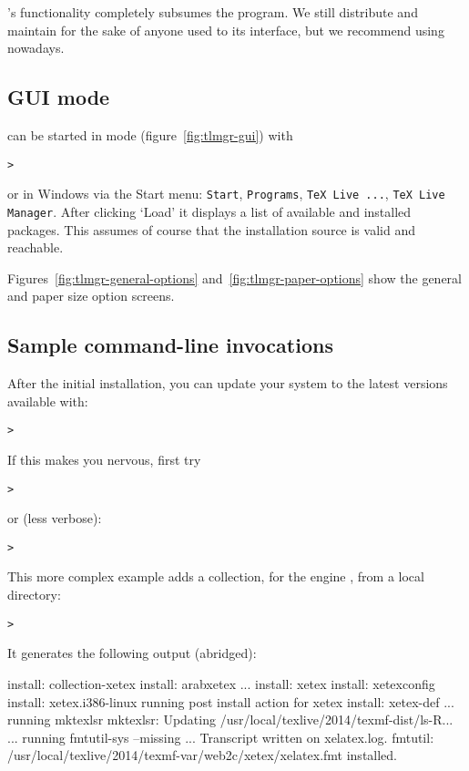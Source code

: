 \documentclass{article}
\begin{document}
's functionality completely subsumes the 
program.  We still distribute and maintain  for the sake
of anyone used to its interface, but we recommend using 
nowadays.

\subsection{ GUI mode}
 can be started in \GUI{} mode (figure~\ref{fig:tlmgr-gui}) with
\begin{alltt}
> 
\end{alltt}
or in Windows via the Start menu: \texttt{Start}, \texttt{Programs},
\texttt{TeX Live ...}, \texttt{TeX Live Manager}. After clicking `Load'
it displays a list of available and installed packages.  This assumes of
course that the installation source is valid and reachable.

Figures~\ref{fig:tlmgr-general-options} and~\ref{fig:tlmgr-paper-options}
show the general and paper size option screens.

\subsection{Sample  command-line invocations}

After the initial installation, you can update your system to the latest
versions available with:
\begin{alltt}
> 
\end{alltt}
If this makes you nervous, first try
\begin{alltt}
> 
\end{alltt}
or (less verbose):
\begin{alltt}
> 
\end{alltt}

This more complex example adds a collection, for the engine \XeTeX, from
a local directory:

\begin{alltt}
> 
\end{alltt}
It generates the following output (abridged):
\begin{fverbatim}
install: collection-xetex
install: arabxetex
...
install: xetex
install: xetexconfig
install: xetex.i386-linux
running post install action for xetex
install: xetex-def
...
running mktexlsr
mktexlsr: Updating /usr/local/texlive/2014/texmf-dist/ls-R...
...
running fmtutil-sys --missing
...
Transcript written on xelatex.log.
fmtutil: /usr/local/texlive/2014/texmf-var/web2c/xetex/xelatex.fmt installed.
\end{fverbatim}
\end{document}
